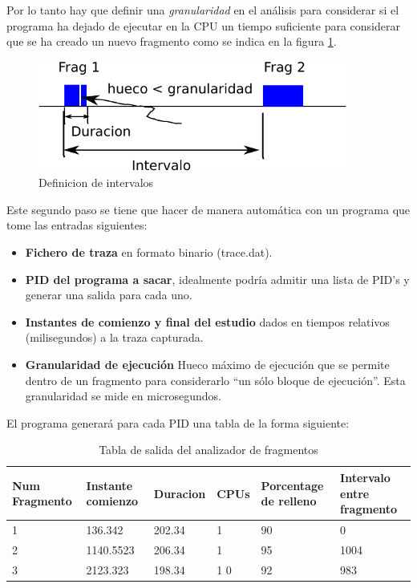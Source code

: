 \documentclass[a4paper,11pt,spanish,twoside]{article}
\begin{document}
Por lo tanto hay que definir una \emph{granularidad} en el análisis
para considerar si el programa ha dejado de ejecutar en la CPU un
tiempo suficiente para considerar que se ha creado un nuevo fragmento
como se indica en la figura \ref{fig:intervalos}.

\begin{figure}[h!]
  \centering
\includegraphics[width=4in]{figuras/intervalos-crop.pdf}  
  \caption{Definicion de intervalos}
  \label{fig:intervalos}
\end{figure}


Este segundo paso se tiene que hacer de manera automática con un
programa que tome las entradas siguientes:

\begin{itemize}
\item \textbf{Fichero de traza} en formato binario (trace.dat).
\item \textbf{PID del programa a sacar}, idealmente podría admitir una
  lista de PID's y generar una salida para cada uno.
\item \textbf{Instantes de comienzo y final del estudio} dados en
  tiempos relativos (milisegundos) a la traza capturada.
\item \textbf{Granularidad de ejecución} Hueco máximo de ejecución que
  se permite dentro de un fragmento para considerarlo ``un sólo bloque
  de ejecución''.  Esta granularidad se mide en microsegundos.
\end{itemize}

El programa generará para cada PID una tabla de la forma siguiente:

\begin{table}[h!]
  \centering
  \begin{tabular}{p{0.7in}|p{0.7in}|p{0.7in}|p{0.7in}|p{0.7in}|p{0.7in}}
    \textbf{Num Fragmento} & \textbf{Instante comienzo} &
    \textbf{Duracion} & \textbf{CPUs} & \textbf{Porcentage
      de relleno} & \textbf{Intervalo entre fragmento}\\ \hline
1 & 136.342 & 202.34 & 1 & 90 & 0 \\
2 & 1140.5523 & 206.34 & 1 & 95 & 1004 \\ 
3 & 2123.323 & 198.34 & 1 0 & 92 & 983\\
  \end{tabular}
  \caption{Tabla de salida del analizador de fragmentos}
  \label{tab:analisis}
\end{table}
\end{document}
